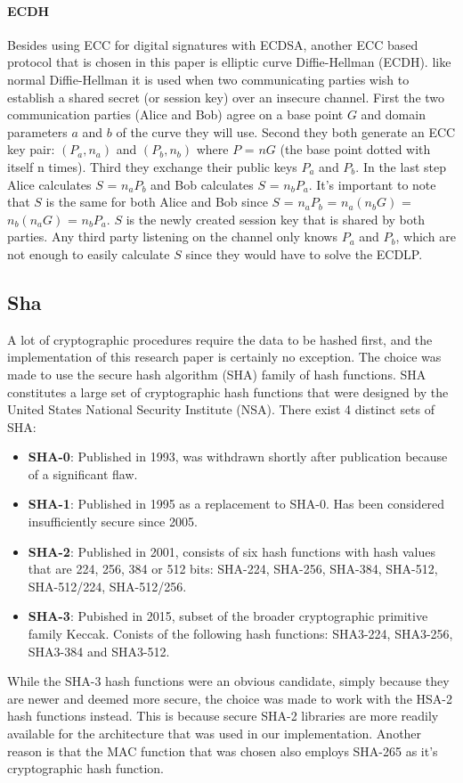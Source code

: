 \documentclass[11pt]{article}
\begin{document}
\paragraph{ECDH} Besides using ECC for digital signatures with ECDSA, another ECC based protocol that is chosen in this paper is elliptic curve Diffie-Hellman (ECDH). like normal Diffie-Hellman it is used when two communicating parties wish to establish a shared secret (or session key) over an insecure channel. First the two communication parties (Alice and Bob) agree on a base point $G$ and domain parameters $a$ and $b$ of the curve they will use. Second they both generate an ECC key pair: $(P_a,n_a)$ and $(P_b,n_b)$ where $P$ = $nG$ (the base point dotted with itself n times). Third they exchange their public keys $P_a$ and $P_b$. In the last step Alice calculates $S$ = $n_a P_b$ and Bob calculates $S$ = $n_b P_a$. It's important to note that $S$ is the same for both Alice and Bob since $S$ = $n_a P_b$ = $n_a ( n_b G )$ = $n_b ( n_a G )$ = $n_b P_a$. $S$ is the newly created session key that is shared by both parties. Any third party listening on the channel only knows $P_a$ and $P_b$, which are not enough to easily calculate $S$ since they would have to solve the ECDLP.

\subsection{Sha} A lot of cryptographic procedures require the data to be hashed first, and the implementation of this research paper is certainly no exception. The choice was made to use the secure hash algorithm (SHA) family of hash functions. SHA constitutes a large set of cryptographic hash functions that were designed by the United States National Security Institute (NSA). There exist 4 distinct sets of SHA\cite{SHAwiki}:

\begin{itemize}
	\item \textbf{SHA-0}: Published in 1993, was withdrawn shortly after publication because of a significant flaw.
	
	\item \textbf{SHA-1}: Published in 1995 as a replacement to SHA-0. Has been considered insufficiently secure since 2005.
	
	\item \textbf{SHA-2}: Published in 2001, consists of six hash functions with hash values that are 224, 256, 384 or 512 bits: SHA-224, SHA-256, SHA-384, SHA-512, SHA-512/224, SHA-512/256.
	
	\item \textbf{SHA-3}: Pubished in 2015, subset of the broader cryptographic primitive family Keccak. Conists of the following hash functions: SHA3-224, SHA3-256, SHA3-384 and SHA3-512.
\end{itemize} 
While the SHA-3 hash functions were an obvious candidate, simply because they are newer and deemed more secure, the choice was made to work with the HSA-2 hash functions instead. This is because secure SHA-2 libraries are more readily available for the architecture that was used in our implementation. Another reason is that the MAC function that was chosen also employs SHA-265 as it's cryptographic hash function. 
\end{document}

